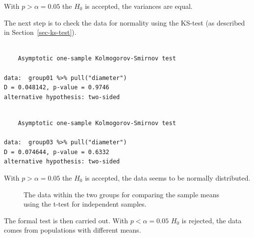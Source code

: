 \documentclass[
  a4paper,
]{scrbook}
\begin{document}
With \(p>\alpha = 0.05\) the \(H_0\) is accepted, the variances are
equal.

The next step is to check the data for normality using the KS-test (as
described in Section~\ref{sec-ks-test}).

\begin{verbatim}

    Asymptotic one-sample Kolmogorov-Smirnov test

data:  group01 %>% pull("diameter")
D = 0.048142, p-value = 0.9746
alternative hypothesis: two-sided
\end{verbatim}

\begin{verbatim}

    Asymptotic one-sample Kolmogorov-Smirnov test

data:  group03 %>% pull("diameter")
D = 0.074644, p-value = 0.6332
alternative hypothesis: two-sided
\end{verbatim}

With \(p>\alpha = 0.05\) the \(H_0\) is accepted, the data seems to be
normally distributed.

\begin{figure}[H]


\caption{\label{fig-t-tst-two-indep}The data within the two groups for
comparing the sample means using the t-test for independent samples.}

\end{figure}%

The formal test is then carried out. With \(p<\alpha=0.05\) \(H_0\) is
rejected, the data comes from populations with different means.
\end{document}

